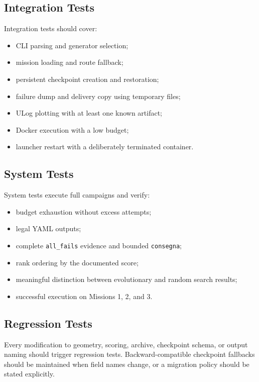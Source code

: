 \documentclass[11pt,a4paper,openany]{report}
\newcommand{\code}[1]{\texttt{#1}}
\begin{document}
\subsection{Integration Tests}
Integration tests should cover:
\begin{itemize}
  \item CLI parsing and generator selection;
  \item mission loading and route fallback;
  \item persistent checkpoint creation and restoration;
  \item failure dump and delivery copy using temporary files;
  \item ULog plotting with at least one known artifact;
  \item Docker execution with a low budget;
  \item launcher restart with a deliberately terminated container.
\end{itemize}

\subsection{System Tests}
System tests execute full campaigns and verify:
\begin{itemize}
  \item budget exhaustion without excess attempts;
  \item legal YAML outputs;
  \item complete \code{all\_fails} evidence and bounded \code{consegna};
  \item rank ordering by the documented score;
  \item meaningful distinction between evolutionary and random search results;
  \item successful execution on Missions 1, 2, and 3.
\end{itemize}

\subsection{Regression Tests}
Every modification to geometry, scoring, archive, checkpoint schema, or output naming should trigger regression tests. Backward-compatible checkpoint fallbacks should be maintained when field names change, or a migration policy should be stated explicitly.
\end{document}

